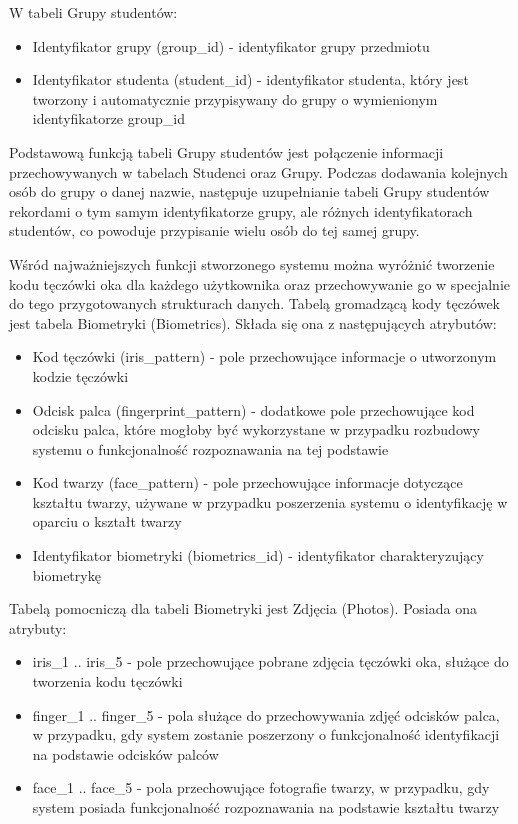 W tabeli Grupy studentów:
\begin{itemize}
\item Identyfikator grupy (group\_id) - identyfikator grupy przedmiotu
\item Identyfikator studenta (student\_id) - identyfikator studenta, który jest tworzony i automatycznie przypisywany do grupy o wymienionym identyfikatorze group\_id
\end{itemize}

Podstawową funkcją tabeli Grupy studentów jest połączenie informacji przechowywanych w tabelach Studenci oraz Grupy. Podczas dodawania kolejnych osób do grupy o danej nazwie, następuje uzupełnianie tabeli Grupy studentów rekordami o tym samym identyfikatorze grupy, ale różnych identyfikatorach studentów, co powoduje przypisanie wielu osób do tej samej grupy. 

Wśród najważniejszych funkcji stworzonego systemu można wyróżnić tworzenie kodu tęczówki oka dla każdego użytkownika oraz przechowywanie go w specjalnie do tego przygotowanych strukturach danych. Tabelą gromadzącą kody tęczówek jest tabela Biometryki (Biometrics). Składa się ona z następujących atrybutów:
\begin{itemize}
\item Kod tęczówki (iris\_pattern) - pole przechowujące informacje o utworzonym kodzie tęczówki 
\item Odcisk palca (fingerprint\_pattern) - dodatkowe pole przechowujące kod odcisku palca, które mogłoby być wykorzystane w przypadku rozbudowy systemu o funkcjonalność rozpoznawania na tej podstawie
\item Kod twarzy (face\_pattern) - pole przechowujące informacje dotyczące kształtu twarzy, używane w przypadku poszerzenia systemu o identyfikację w oparciu o kształt twarzy
\item Identyfikator biometryki (biometrics\_id) - identyfikator charakteryzujący biometrykę
\end{itemize}

Tabelą pomocniczą dla tabeli Biometryki jest Zdjęcia (Photos). Posiada ona atrybuty:
\begin{itemize}
\item iris\_1 .. iris\_5 - pole przechowujące pobrane zdjęcia tęczówki oka, służące do tworzenia kodu tęczówki
\item finger\_1 .. finger\_5 - pola służące do przechowywania zdjęć odcisków palca, w przypadku, gdy system zostanie poszerzony o funkcjonalność identyfikacji na podstawie odcisków palców
\item face\_1 .. face\_5 - pola przechowujące fotografie twarzy, w przypadku, gdy system posiada funkcjonalność rozpoznawania na podstawie kształtu twarzy
\end{itemize}

